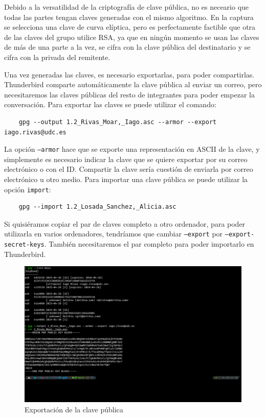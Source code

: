 Debido a la versatilidad de la criptografía de clave pública, no es neceario que todas las partes tengan claves generadas con el mismo algoritmo. En la captura se selecciona una clave de curva elíptica, pero es perfectamente factible que otra de las claves del grupo utilice RSA, ya que en ningún momento se usan las claves de más de una parte a la vez, se cifra con la clave pública del destinatario y se cifra con la privada del remitente.

Una vez generadas las claves, es necesario exportarlas, para poder compartirlas. Thunderbird comparte automáticamente la clave pública al enviar un correo, pero necesitaremos las claves públicas del resto de integrantes para poder empezar la conversación. Para exportar las claves se puede utilizar el comando:

\begin{verbatim}
    gpg --output 1.2_Rivas_Moar,_Iago.asc --armor --export iago.rivas@udc.es
\end{verbatim}

La opción \texttt{--armor} hace que se exporte una representación en ASCII de la clave, y simplemente es necesario indicar la clave que se quiere exportar por su correo electrónico o con el ID. Compartir la clave sería cuestión de enviarla por correo electrónico u otro medio. Para importar una clave pública se puede utilizar la opción \texttt{import}:

\begin{verbatim}
    gpg --import 1.2_Losada_Sanchez,_Alicia.asc
\end{verbatim}

Si quisiéramos copiar el par de claves completo a otro ordenador, para poder utilizarla en varios ordenadores, tendríamos que cambiar \texttt{--export} por \texttt{--export-secret-keys}. También necesitaremos el par completo para poder importarlo en Thunderbird.

\begin{figure}[H]
    \includegraphics[width=\textwidth]{gpg-export.png}
    \caption{Exportación de la clave pública}
\end{figure}


